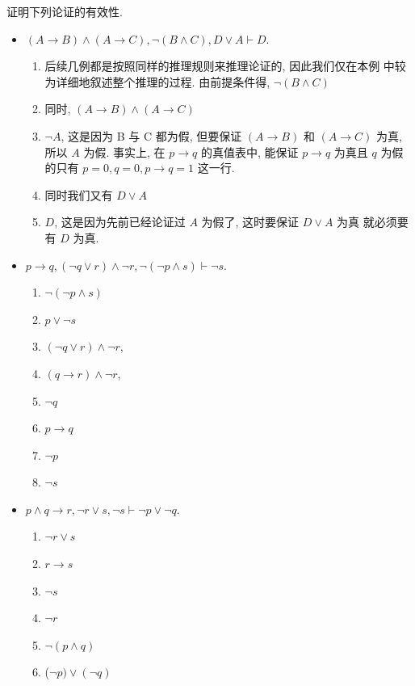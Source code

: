 \documentclass[10pt,UTF8]{book} %
\begin{document}
\begin{example}
    证明下列论证的有效性.
    \begin{itemize}
        \item $(A \to B)\wedge(A \to C), \lnot (B \wedge C), D 
        \vee A \vdash D$.
        \begin{enumerate}[label={${\arabic*}^\circ$}, itemsep=0pt]
            \item 后续几例都是按照同样的推理规则来推理论证的, 因此我们仅在本例
            中较为详细地叙述整个推理的过程. 由前提条件得, $\lnot (B \wedge C)$
            \item 同时, $(A \to B)\wedge(A \to C)$
            \item $\lnot A$, 这是因为 B 与 C 都为假, 但要保证 $(A \to B)$ 和 $(A \to C)$ 为真, 所以 $A$ 为假. 事实上, 在 $p \to q$ 的真值表中,
            能保证 $p \to q$ 为真且 $q$ 为假的只有 $p=0, q=0, p \to q = 1$ 这一行.
            \item 同时我们又有 $D \vee A$
            \item $D$, 这是因为先前已经论证过 $A$ 为假了, 这时要保证 $D \vee A$ 为真
            就必须要有 $D$ 为真.
        \end{enumerate}
        \item $p \to q, (\lnot q \vee r)\wedge \lnot r, \lnot(\lnot p \wedge s) \vdash \lnot s$.
        \begin{enumerate}[label={${\arabic*}^\circ$}, itemsep=0pt]
            \item $\lnot(\lnot p \wedge s)$
            \item $p \vee \lnot s$
            \item $(\lnot q \vee r)\wedge \lnot r$,
            \item $(q \to r) \wedge \lnot r$,
            \item $\lnot q$
            \item $p \to q$
            \item $\lnot p$
            \item $\lnot s$
        \end{enumerate}
        \item $p \wedge q \to r, \lnot r \vee s, \lnot s \vdash \lnot p \vee \lnot q$.
        \begin{enumerate}[label={${\arabic*}^\circ$}, itemsep=0pt]
            \item $\lnot r \vee s$
            \item $r \to s$
            \item $\lnot s$
            \item $\lnot r$
            \item $\lnot (p \wedge q)$
            \item ($\lnot p) \vee (\lnot q)$
        \end{enumerate}
    \end{itemize}
\end{example}
\end{document}
